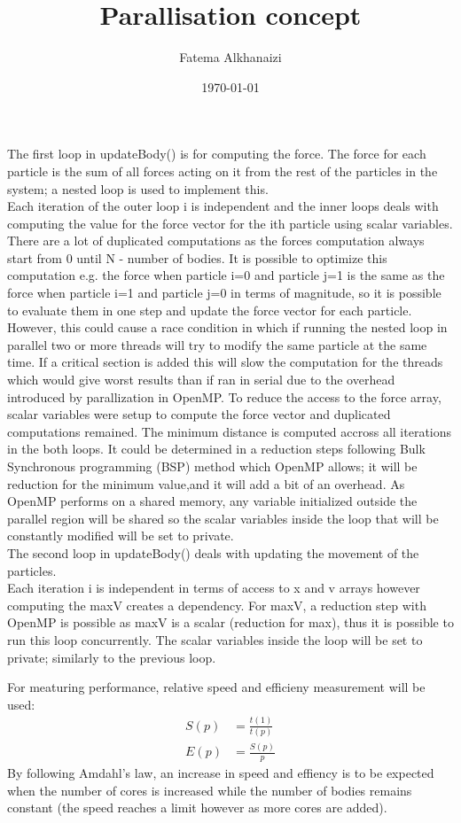\documentclass[11pt]{article}
\title{Parallisation concept}
\author{Fatema Alkhanaizi}
\date{\today}
\begin{document}
    \maketitle
    The first loop in updateBody() is for computing the force. The force for each particle is the sum of all forces acting on it from the rest of the particles in the system; a nested loop is used to implement this. \\
    Each iteration of the outer loop i is independent and the inner loops deals with computing the value for the force vector for the ith particle using scalar variables. There are a lot of duplicated computations as the forces computation always start from 0 until N - number of bodies. It is possible to optimize this computation e.g. the force when  particle i=0 and particle j=1 is the same as the force when particle i=1 and particle j=0 in terms of magnitude, so it is possible to evaluate them in one step and update the force vector for each particle. However, this could cause a race condition in which if running the nested loop in parallel two or more threads will try to modify the same particle at the same time. If a critical section is added this will slow the computation for the threads which would give worst results than if ran in serial due to the overhead introduced by parallization in OpenMP. To reduce the access to the force array, scalar variables were setup to compute the force vector and duplicated computations remained. The minimum distance is computed accross all iterations in the both loops. It could be determined in a reduction steps following Bulk Synchronous programming (BSP) method which OpenMP allows; it will be reduction for the minimum value,and it will add a bit of an overhead. As OpenMP performs on a shared memory, any variable initialized outside the parallel region will be shared so the scalar variables inside the loop that will be constantly modified will be set to private. \\
    
    The second loop in updateBody() deals with updating the movement of the particles. \\
    Each iteration i is independent in terms of access to x and v arrays however computing the maxV creates a dependency. For maxV, a reduction step with OpenMP is possible  as maxV is a scalar (reduction for max), thus it is possible to run this loop concurrently. The scalar variables inside the loop will be set to private; similarly to the previous loop.

For meaturing performance, relative speed and efficieny measurement will be used:
\begin{align*}
    S(p) &= \frac{t(1)}{t(p)} \\
    E(p) &= \frac{S(p)}{p}
\end{align*}
By following Amdahl's law, an increase in speed and effiency is to be expected when the number of cores is increased while the number of bodies remains constant (the speed reaches a limit however as more cores are added). 
\end{document}
